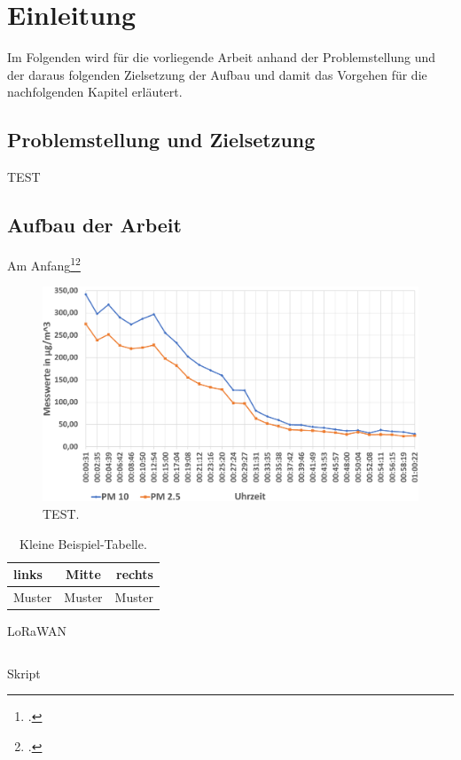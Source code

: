 \chapter{Einleitung}\label{chapter:Einleitun}
Im Folgenden wird für die vorliegende Arbeit anhand der Problemstellung und der daraus folgenden Zielsetzung der Aufbau und damit das Vorgehen für die nachfolgenden Kapitel erläutert.
\section{Problemstellung und Zielsetzung}\label{section:Problemstellung-und-Zielsetzun}
TEST

\section{Aufbau der Arbeit}\label{section:Aufbau-der-Arbei}

Am Anfang\footcite[Vgl.][1]{vomBrocke.2004}\nzitat\footcite[Vgl.][1]{vomBrocke.2004}

\begin{figure}[H]
\centering
\includegraphics[width=\linewidth]{graphics/Feinstaub-Stuttgart.pdf}
\caption[TEST.]{TEST.\footnotemark}
\label{abb:Grafik}
\end{figure}

\begin{table}[H]
\centering
\begin{tabular}{lcr}
links & Mitte & rechts \\
\hline
Muster & Muster & Muster \\
\end{tabular}
\caption{Kleine Beispiel-Tabelle.}
\label{tab:BeispielTabelleKlein}
\end{table}


\ac{LoRaWAN}

\begin{listing}[H]
\inputminted[frame=lines,breaklines=true]{bash}{update_files.sh}
\caption[Skript]{Skript\footnotemark}
\label{listing:percentiles-elasticsearch}
\end{listing}
